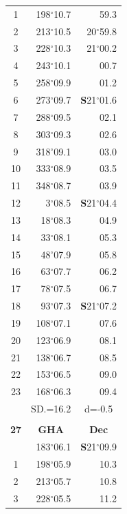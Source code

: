 \documentclass[10pt, a4paper]{report}
\begin{document}
\begin{scriptsize}
\begin{tabular*}{0.2\textwidth}[t]{@{\extracolsep{\fill}}|c|rr|}
1 & 198$^\circ$10.7 & 59.3\\
2 & 213$^\circ$10.5 & 20$^\circ$59.8\\
3 & 228$^\circ$10.3 & 21$^\circ$00.2\\
4 & 243$^\circ$10.1 & 00.7\\
5 & 258$^\circ$09.9 & 01.2\\[2Pt]
6 & 273$^\circ$09.7 & \textbf{S}21$^\circ$01.6\\
7 & 288$^\circ$09.5 & 02.1\\
8 & 303$^\circ$09.3 & 02.6\\
9 & 318$^\circ$09.1 & \raisebox{0.24ex}{\boldmath$\cdot$~\boldmath$\cdot$~~}03.0\\
10 & 333$^\circ$08.9 & 03.5\\
11 & 348$^\circ$08.7 & 03.9\\[2Pt]
12 & 3$^\circ$08.5 & \textbf{S}21$^\circ$04.4\\
13 & 18$^\circ$08.3 & 04.9\\
14 & 33$^\circ$08.1 & 05.3\\
15 & 48$^\circ$07.9 & \raisebox{0.24ex}{\boldmath$\cdot$~\boldmath$\cdot$~~}05.8\\
16 & 63$^\circ$07.7 & 06.2\\
17 & 78$^\circ$07.5 & 06.7\\[2Pt]
18 & 93$^\circ$07.3 & \textbf{S}21$^\circ$07.2\\
19 & 108$^\circ$07.1 & 07.6\\
20 & 123$^\circ$06.9 & 08.1\\
21 & 138$^\circ$06.7 & \raisebox{0.24ex}{\boldmath$\cdot$~\boldmath$\cdot$~~}08.5\\
22 & 153$^\circ$06.5 & 09.0\\
23 & 168$^\circ$06.3 & 09.4\\
\hline
\rule{0pt}{2.4ex} & \multicolumn{1}{c}{SD.=16.2} & \multicolumn{1}{c|}{d=-0.5}\\
\hline
\multicolumn{1}{c}{}\\[-0.5ex]\hline
\multicolumn{1}{|c|}{\rule{0pt}{2.6ex}\textbf{27}} & \multicolumn{1}{c}{\textbf{GHA}} & \multicolumn{1}{c|}{\textbf{Dec}}\\
\hline\rule{0pt}{2.6ex}\noindent
0 & 183$^\circ$06.1 & \textbf{S}21$^\circ$09.9\\
1 & 198$^\circ$05.9 & 10.3\\
2 & 213$^\circ$05.7 & 10.8\\
3 & 228$^\circ$05.5 & \raisebox{0.24ex}{\boldmath$\cdot$~\boldmath$\cdot$~~}11.2\\

\end{tabular*}
\end{scriptsize}
\end{document}
